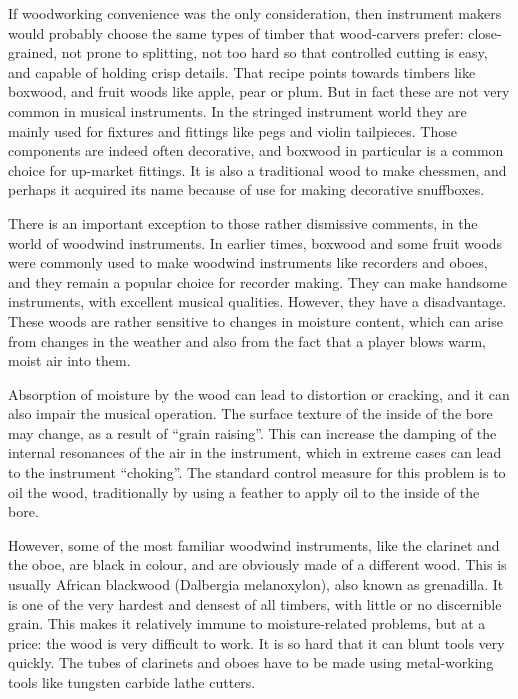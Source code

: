   If woodworking convenience was the only consideration, then instrument makers 
  would probably choose the same types of timber that wood-carvers prefer: 
  close-grained, not prone to splitting, not too hard so that controlled 
  cutting is easy, and capable of holding crisp details. That recipe points 
  towards timbers like boxwood, and fruit woods like apple, pear or plum. But 
  in fact these are not very common in musical instruments. In the stringed 
  instrument world they are mainly used for fixtures and fittings like pegs and 
  violin tailpieces. Those components are indeed often decorative, and boxwood 
  in particular is a common choice for up-market fittings. It is also a 
  traditional wood to make chessmen, and perhaps it acquired its name because 
  of use for making decorative snuffboxes. 

  There is an important exception to those rather dismissive comments, in the 
  world of woodwind instruments. In earlier times, boxwood and some fruit woods 
  were commonly used to make woodwind instruments like recorders and oboes, and 
  they remain a popular choice for recorder making. They can make handsome 
  instruments, with excellent musical qualities. However, they have a 
  disadvantage. These woods are rather sensitive to changes in moisture 
  content, which can arise from changes in the weather and also from the fact 
  that a player blows warm, moist air into them. 

  Absorption of moisture by the wood can lead to distortion or cracking, and it 
  can also impair the musical operation. The surface texture of the inside of 
  the bore may change, as a result of “grain raising”. This can increase the 
  damping of the internal resonances of the air in the instrument, which in 
  extreme cases can lead to the instrument “choking”. The standard control 
  measure for this problem is to oil the wood, traditionally by using a feather 
  to apply oil to the inside of the bore. 

  However, some of the most familiar woodwind instruments, like the clarinet 
  and the oboe, are black in colour, and are obviously made of a different 
  wood. This is usually African blackwood (Dalbergia melanoxylon), also known 
  as grenadilla. It is one of the very hardest and densest of all timbers, with 
  little or no discernible grain. This makes it relatively immune to 
  moisture-related problems, but at a price: the wood is very difficult to 
  work. It is so hard that it can blunt tools very quickly. The tubes of 
  clarinets and oboes have to be made using metal-working tools like tungsten 
  carbide lathe cutters. 

